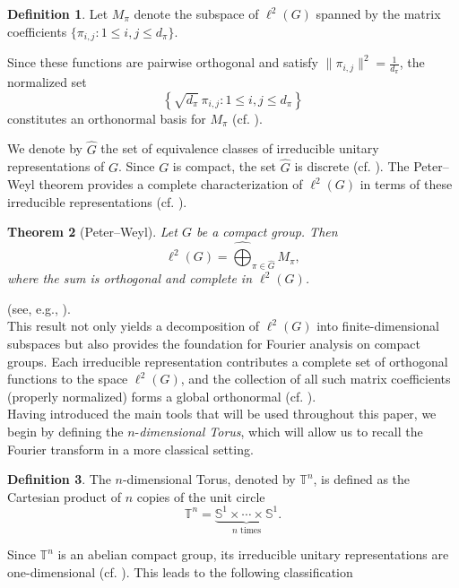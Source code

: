 \documentclass[11pt]{article}
\newtheorem{thm}{Theorem}[section]
\theoremstyle{definition}
\newtheorem{defn}[thm]{Definition}
\theoremstyle{remark}
\numberwithin{equation}{section}
\begin{document}
\begin{defn}
    Let $M_\pi$ denote the subspace of $\ell^2(G)$ spanned by the matrix coefficients $\{\pi_{i,j} : 1 \leq i,j \leq d_\pi\}$.
\end{defn}
Since these functions are pairwise orthogonal and satisfy $\| \pi_{i,j} \|^2 = \frac{1}{d_\pi}$, the normalized set
\[
\left\{ \sqrt{d_\pi}\, \pi_{i,j} : 1 \leq i,j \leq d_\pi \right\}
\]
constitutes an orthonormal basis for $M_\pi$ (cf. \cite{Preli}).

We denote by $\widehat{G}$ the set of equivalence classes of irreducible unitary representations of $G$. Since $G$ is compact, the set $\widehat{G}$ is discrete  (cf. \cite{DualDiscreto1939}). The Peter–Weyl theorem provides a complete characterization of $\ell^2(G)$ in terms of these irreducible representations (cf. \cite{Preli,Faraut_2008}).

\begin{thm}[Peter–Weyl]\label{PETER}
Let $G$ be a compact group. Then
\[
\ell^2(G) = \widehat{\bigoplus}_{\pi \in \widehat{G}} M_\pi,
\]
where the sum is orthogonal and complete in $\ell^2(G)$.
\end{thm}
(see, e.g., \cite{Preli,Faraut_2008}).\\

This result not only yields a decomposition of $\ell^2(G)$ into finite-dimensional subspaces but also provides the foundation for Fourier analysis on compact groups. Each irreducible representation contributes a complete set of orthogonal functions to the space $\ell^2(G)$, and the collection of all such matrix coefficients (properly normalized) forms a global orthonormal  (cf. \cite{peterweylOriginal}).\\

Having introduced the main tools that will be used throughout this paper, we begin by defining the $n$-\textit{dimensional Torus}, which will allow us to recall the Fourier transform in a more classical setting.

\begin{defn}
    The $n$-dimensional Torus, denoted by $\mathbb{T}^n$, is defined as the Cartesian product of $n$ copies of the unit circle
    \[
        \mathbb{T}^n = \underbrace{\mathbb{S}^1 \times \cdots \times \mathbb{S}^1}_{n \text{ times}}.
    \]
\end{defn}

Since $\mathbb{T}^n$ is an abelian compact group, its irreducible unitary representations are one-dimensional (cf. \cite{Faraut_2008,LieHall}). This leads to the following classification
\end{document}

